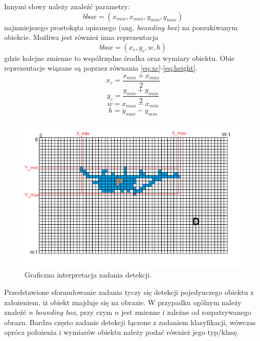 Innymi słowy należy znaleźć parametry:
\begin{equation}
bbox = (x_{min},x_{max},y_{min},y_{max})
\label{eq:bbox_xxyy}
\end{equation}
najmniejszego prostokąta opisanego (ang. \emph{bounding box}) na poszukiwanym obiekcie.
Możliwa jest również inna reprezentacja
\begin{equation}
bbox = (x_c,y_c, w,h)
\label{eq:bbox_xywh}
\end{equation}
gdzie kolejne zmienne to współrzędne  środka  oraz wymiary obiektu. Obie reprezentacje wiązane są poprzez równania \eqref{eq:xc}-\eqref{eq:height}.
\begin{equation}
x_c = \frac{x_{min} + x_{max}}{2}
\label{eq:xc}
\end{equation}
\begin{equation}
y_c = \frac{y_{min} + y_{max}}{2}
\label{eq:yc}
\end{equation}
\begin{equation}
w = x_{max} - x_{min}
\label{eq:width}
\end{equation}
\begin{equation}
h = y_{max} - y_{min}
\label{eq:height}
\end{equation}

\begin{figure}
    \centering
    \includegraphics[width=0.9\linewidth]{images/grid_obj.png}
    \caption{Graficzna interpretacja zadania detekcji.}
    \label{fig:det_grid}
\end{figure}

Przedstawione sformułowanie zadania tyczy się detekcji pojedynczego obiektu z założeniem, iż obiekt znajduje się na obrazie. 
W przypadku ogólnym należy znaleźć $n$ \emph{bounding box}, przy czym $n$ jest zmienne i zależne od rozpatrywanego obrazu.
Bardzo często zadanie detekcji łączone z zadaniem klasyfikacji, wówczas oprócz położenia i wymiarów obiektu należy podać również jego typ/klasę. 

